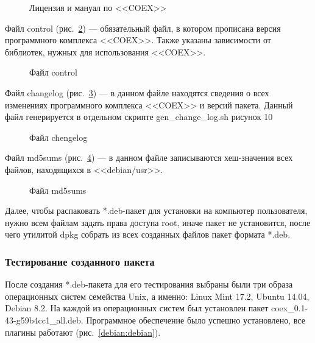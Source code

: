 \begin{figure}[h!]
\caption{ Лицензия и мануал по <<COEX>> }
\label{LIcenzMan:LIcenzMan}
\end{figure}

Файл control (рис.~\ref{control:control}) --- обязательный файл, в котором прописана версия программного комплекса <<COEX>>. Также указаны зависимости от библиотек, нужных для использования <<COEX>>.

\begin{figure}[h!]
\caption{ Файл control }
\label{control:control}
\end{figure}

Файл changelog (рис.~\ref{chengelog:chengelog}) --- в данном файле находятся сведения о всех изменениях программного комплекса <<COEX>> и версий пакета. Данный файл генерируется в отдельном скрипте gen\_change\_log.sh рисунок 10

\begin{figure}[h!]
\caption{ Файл chengelog }
\label{chengelog:chengelog}
\end{figure}

Файл md5sums (рис.~\ref{md5sums:md5sums}) --- в данном файле записываются хеш-значения всех файлов, находящихся в <<debian/usr>>.

\begin{figure}[h!]
\caption{ Файл md5sums }
\label{md5sums:md5sums}
\end{figure}

Далее, чтобы распаковать *.deb-пакет для установки на компьютер пользователя, нужно всем файлам задать права доступа root, иначе пакет не установится, после чего утилитой dpkg собрать из всех созданных файлов пакет формата *.deb. 

\subsubsection{Тестирование созданного пакета}

После создания *.deb-пакета для его тестирования выбраны были три образа операционных систем семейства Unix, а именно: Linux Mint 17.2, Ubuntu 14.04, Debian 8.2. На каждой из операционных систем был установлен пакет coex\_0.1-43-g59b4cc1\_all.deb. Программное обеспечение было успешно установлено, все плагины работают (рис.~\ref{debian:debian}).

